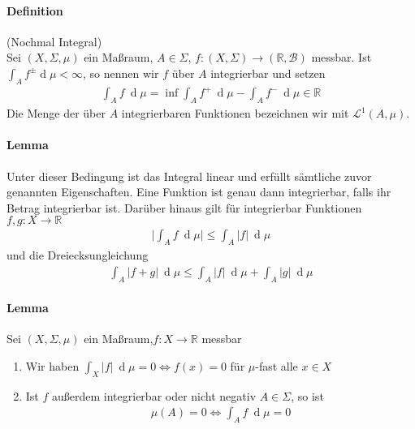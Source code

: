 \documentclass[12pt,a4paper,fleqn]{article}
\def\d{{\operatorname{d}}}
\begin{document}
\paragraph{Definition} (Nochmal Integral)\\
Sei $(X, \Sigma, \mu)$ ein Maßraum,  $A \in \Sigma$, $f\colon(X, \Sigma) \rightarrow (\mathbb{R}, \mathcal{B})$ messbar. Ist $\int_A f^\pm \d\mu < \infty$, so nennen wir $f$ über $A$ integrierbar und setzen
\begin{align*}
\int_A f\ \d\mu = \inf \int_A f^+\ \d\mu - \int_A f^-\ \d\mu \in \mathbb{R}
\end{align*}
Die Menge der über $A$ integrierbaren Funktionen bezeichnen wir mit $\mathscr{L}^1(A, \mu)$.

\paragraph{Lemma} Unter dieser Bedingung ist das Integral linear und erfüllt sämtliche zuvor genannten Eigenschaften. Eine Funktion ist genau dann integrierbar, falls ihr Betrag integrierbar ist. Darüber hinaus gilt für integrierbar Funktionen $f, g\colon X \rightarrow \mathbb{R}$
\begin{align*}
\bigg|{\int_A f\ \d\mu}\bigg| \leq \int_A \vert{f}\vert\ \d\mu 
\end{align*}
und die Dreiecksungleichung
\begin{align*}
\int_A \vert{f + g}\vert\ \d\mu \leq \int_A \vert{f}\vert\ \d\mu + \int_A \vert{g}\vert\ \d\mu
\end{align*}

\paragraph{Lemma} Sei $(X, \Sigma, \mu)$ ein Maßraum,$f\colon X \rightarrow \mathbb{R}$ messbar
\begin{enumerate}
\item Wir haben $\int_X \vert{f}\vert\ \d\mu = 0 \Leftrightarrow f(x) = 0$ für $\mu$-fast alle $x \in X$
\item Ist $f$ außerdem integrierbar oder nicht negativ $A \in \Sigma$, so ist 
\begin{align*}
\mu(A) = 0 \Leftrightarrow \int_A f\ \d\mu = 0
\end{align*}
\end{enumerate}
\end{document}
